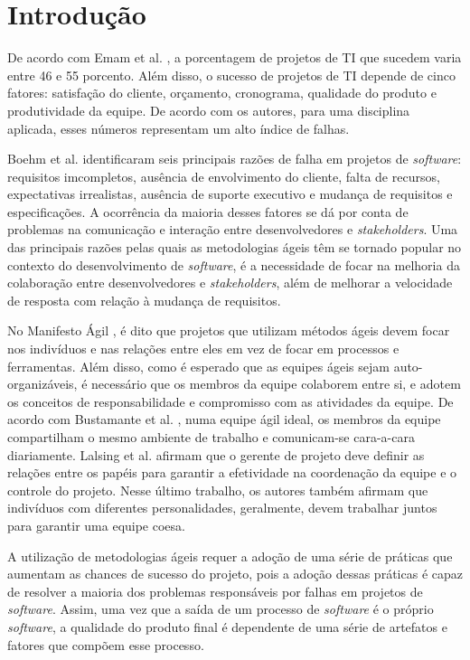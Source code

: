 \chapter{Introdução}
\label{introducao}

De acordo com Emam et al. \cite{emam}, a porcentagem de projetos de TI que sucedem varia entre 46 e 55 porcento. Além disso, o sucesso de projetos de TI depende de cinco fatores: satisfação do cliente, orçamento, cronograma, qualidade do produto e produtividade da equipe. De acordo com os autores, para uma disciplina aplicada, esses números representam um alto índice de falhas.

Boehm et al. \cite{boehm} identificaram seis principais razões de falha em projetos de \textit{software}: requisitos imcompletos, ausência de envolvimento do cliente, falta de recursos, expectativas irrealistas, ausência de suporte executivo e mudança de requisitos e especificações. A ocorrência da maioria desses fatores se dá por conta de problemas na comunicação e interação entre desenvolvedores e \textit{stakeholders}. Uma das principais razões pelas quais as metodologias ágeis têm se tornado popular no contexto do desenvolvimento de \textit{software}, é a necessidade de focar na melhoria da colaboração entre desenvolvedores e \textit{stakeholders}, além de melhorar a velocidade de resposta com relação à mudança de requisitos.

No Manifesto Ágil \cite{manifesto}, é dito que projetos que utilizam métodos ágeis devem focar nos indivíduos e nas relações entre eles em vez de focar em processos e ferramentas. Além disso, como é esperado que as equipes ágeis sejam auto-organizáveis, é necessário que os membros da equipe colaborem entre si, e adotem os conceitos de responsabilidade e compromisso com as atividades da equipe. De acordo com Bustamante et al. \cite{bustamante}, numa equipe ágil ideal, os membros da equipe compartilham o mesmo ambiente de trabalho e comunicam-se cara-a-cara diariamente. Lalsing et al. \cite{lalsing} afirmam que o gerente de projeto deve definir as relações entre os papéis para garantir a efetividade na coordenação da equipe e o controle do projeto. Nesse último trabalho, os autores também afirmam que indivíduos com diferentes personalidades, geralmente, devem trabalhar juntos para garantir uma equipe coesa.

A utilização de metodologias ágeis requer a adoção de uma série de práticas que aumentam as chances de sucesso do projeto, pois a adoção dessas práticas é capaz de resolver a maioria dos problemas responsáveis por falhas em projetos de \textit{software}. Assim, uma vez que a saída de um processo de \textit{software} é o próprio \textit{software}, a qualidade do produto final é dependente de uma série de artefatos e fatores que compõem esse processo.

